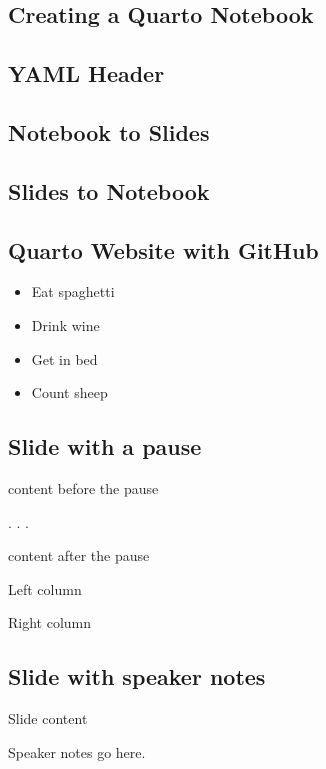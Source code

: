 \documentclass[
  letterpaper,
  DIV=11,
  numbers=noendperiod]{scrartcl}
\providecommand{\tightlist}{%
  \setlength{\itemsep}{0pt}\setlength{\parskip}{0pt}}\usepackage{longtable,booktabs,array}
\begin{document}
\hypertarget{section}{%
\subsection{}\label{section}}

\hypertarget{creating-a-quarto-notebook}{%
\subsection{Creating a Quarto
Notebook}\label{creating-a-quarto-notebook}}

\hypertarget{yaml-header}{%
\subsection{YAML Header}\label{yaml-header}}

\hypertarget{notebook-to-slides}{%
\subsection{Notebook to Slides}\label{notebook-to-slides}}

\hypertarget{slides-to-notebook}{%
\subsection{Slides to Notebook}\label{slides-to-notebook}}

\hypertarget{quarto-website-with-github}{%
\subsection{Quarto Website with
GitHub}\label{quarto-website-with-github}}

\begin{itemize}
\tightlist
\item
  Eat spaghetti
\item
  Drink wine
\end{itemize}

\begin{itemize}
\tightlist
\item
  Get in bed
\item
  Count sheep
\end{itemize}

\hypertarget{slide-with-a-pause}{%
\subsection{Slide with a pause}\label{slide-with-a-pause}}

content before the pause

. . .

content after the pause

Left column

Right column

\hypertarget{slide-with-speaker-notes}{%
\subsection{Slide with speaker notes}\label{slide-with-speaker-notes}}

Slide content

Speaker notes go here.
\end{document}
